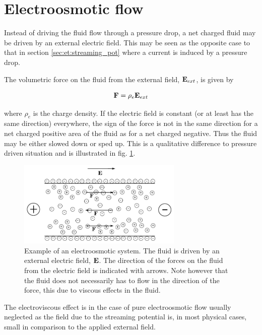 \section{Electroosmotic flow}\label{sec:et:electroosmosis}
Instead of driving the fluid flow through a pressure drop, a net
charged fluid may be driven by an external electric field. This may
be seen as the opposite case to that in section
\ref{sec:et:streaming_pot} where a current is induced by a pressure
drop.

The volumetric force on the fluid from the external field, $\mathbf{E}_{ext}$,
is given by

\begin{equation}
\mathbf{F} = \mathrm{\rho}_e \mathbf{E}_{ext}
\end{equation}

where $\rho_e$ is the charge density. If the electric field is
constant (or at least has the same direction) everywhere, the sign of
the force is not in the same direction for a net charged positive area
of the fluid as for a net charged negative. Thus the fluid may be
either slowed down or sped up. This is a qualitative difference to
pressure driven situation and is illustrated in fig. \ref{fig:et:eo}.

\begin{figure}
\begin{center}
\includegraphics[width=0.7\textwidth]{fig/channel_electroosmosis.pdf}
\end{center}
\caption{Example of an electroosmotic system. The fluid is driven by an
  external electric field, $\mathbf{E}$. The direction of the forces on the fluid
  from the electric field is indicated with arrows. Note however that
  the fluid does not necessarily has to flow in the direction of the
  force, this due to viscous effects in the fluid. }
\label{fig:et:eo}
\end{figure}

The electroviscous effect is in the case of pure electroosmotic flow
usually neglected as the field due to the streaming potential is, in
most physical cases, small in comparison to the applied external
field. \cite{wang-poi}
